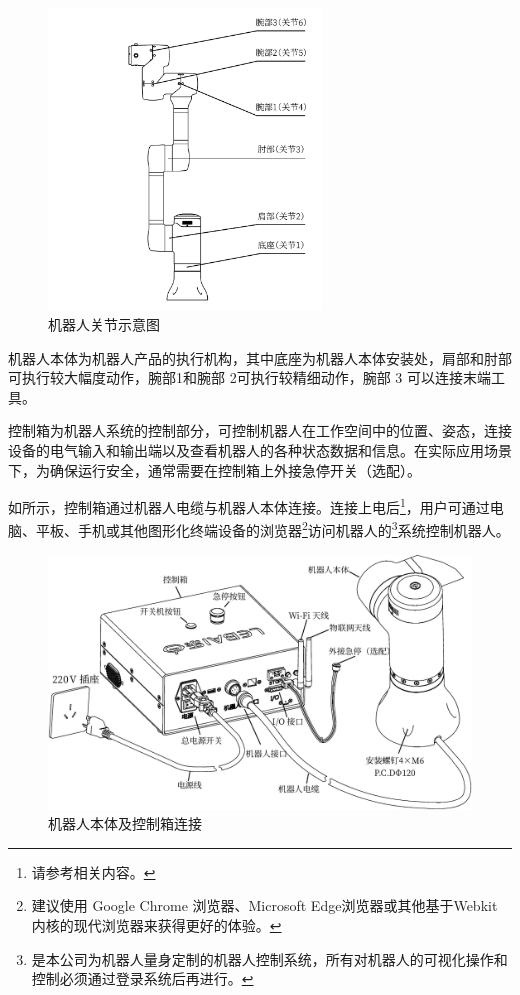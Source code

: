 \begin{figure}[ht]
    \centering
    \includegraphics[height=8cm]{image/arms.pdf}
    \caption{机器人关节示意图}
    \label{fig:机器人关节示意图}
\end{figure}

机器人本体为机器人产品的执行机构，其中底座为机器人本体安装处，肩部和肘部可执行较大幅度动作，腕部1和腕部 2可执行较精细动作，腕部 3 可以连接末端工具。

控制箱为机器人系统的控制部分，可控制机器人在工作空间中的位置、姿态，连接设备的电气输入和输出端以及查看机器人的各种状态数据和信息。在实际应用场景下，为确保运行安全，通常需要在控制箱上外接急停开关（选配）。


如所示，控制箱通过机器人电缆与机器人本体连接。连接上电后\footnote{请参考相关内容。}，用户可通过电脑、平板、手机或其他图形化终端设备的浏览器\footnote{建议使用 Google Chrome 浏览器、Microsoft Edge浏览器或其他基于Webkit 内核的现代浏览器来获得更好的体验。 }访问机器人的\LM\footnote{\LM 是本公司为机器人量身定制的机器人控制系统，所有对机器人的可视化操作和控制必须通过登录\LM 系统后再进行。}系统控制机器人。

\begin{figure}[h!]
    \centering
    \includegraphics[width=\textwidth]{line_graphs/robot_links.pdf}
    \caption{机器人本体及控制箱连接}
    \label{fig:机器人本体及控制箱连接}
\end{figure}

